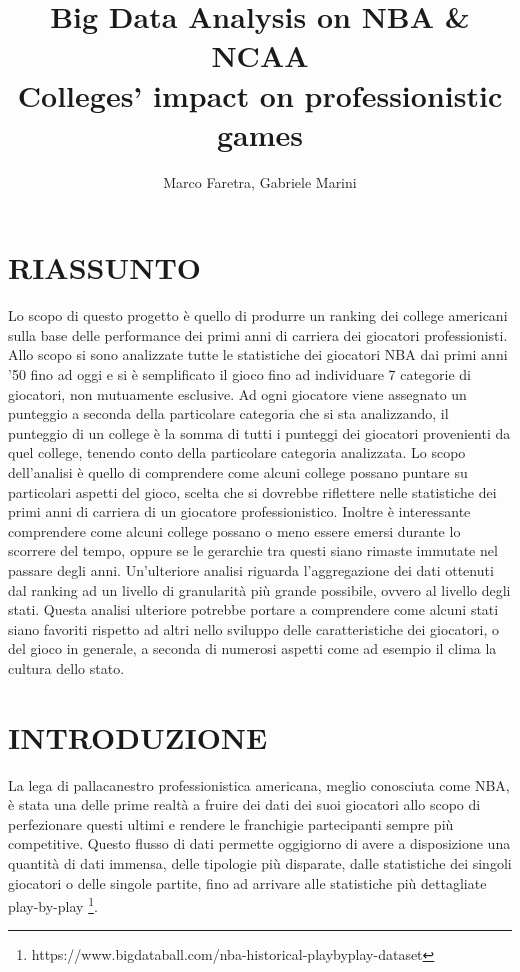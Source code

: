 \documentclass[10pt,a4paper,twocolumn]{article}
\author{Marco Faretra, Gabriele Marini}
\title{\textbf{Big Data Analysis on NBA \& NCAA}\\Colleges' impact on professionistic games}
\begin{document}
	
\maketitle
\thispagestyle{empty}
\pagestyle{empty}
		
\section*{RIASSUNTO}

Lo scopo di questo progetto è quello di produrre un ranking dei college americani sulla base delle performance dei primi anni di carriera dei giocatori professionisti. Allo scopo si sono analizzate tutte le statistiche dei giocatori NBA dai primi anni '50 fino ad oggi e si è semplificato il gioco fino ad individuare 7 categorie di giocatori, non mutuamente esclusive.
Ad ogni giocatore viene assegnato un punteggio a seconda della particolare categoria che si sta analizzando, il punteggio di un college è la somma di tutti i punteggi dei giocatori provenienti da quel college, tenendo conto della particolare categoria analizzata. Lo scopo dell'analisi è quello di comprendere come alcuni college possano puntare su particolari aspetti del gioco, scelta che si dovrebbe riflettere nelle statistiche dei primi anni di carriera di un giocatore professionistico. Inoltre è interessante comprendere come alcuni college possano o meno essere emersi durante lo scorrere del tempo, oppure se le gerarchie tra questi siano rimaste immutate nel passare degli anni. Un'ulteriore analisi riguarda l'aggregazione dei dati ottenuti dal ranking ad un livello di granularità più grande possibile, ovvero al livello degli stati. Questa analisi ulteriore potrebbe portare a comprendere come alcuni stati siano favoriti rispetto ad altri nello sviluppo delle caratteristiche dei giocatori, o del gioco in generale, a seconda di numerosi aspetti come ad esempio il clima la cultura dello stato.

\section{INTRODUZIONE} 

La lega di pallacanestro professionistica americana, meglio conosciuta come NBA, è stata una delle prime realtà a fruire dei dati dei suoi giocatori allo scopo di perfezionare questi ultimi e rendere le franchigie partecipanti sempre più competitive. Questo flusso di dati permette oggigiorno di avere a disposizione una quantità di dati immensa, delle tipologie più disparate, dalle statistiche dei singoli giocatori o delle singole partite, fino ad arrivare alle statistiche più dettagliate play-by-play \footnote{https://www.bigdataball.com/nba-historical-playbyplay-dataset}.
\end{document}
